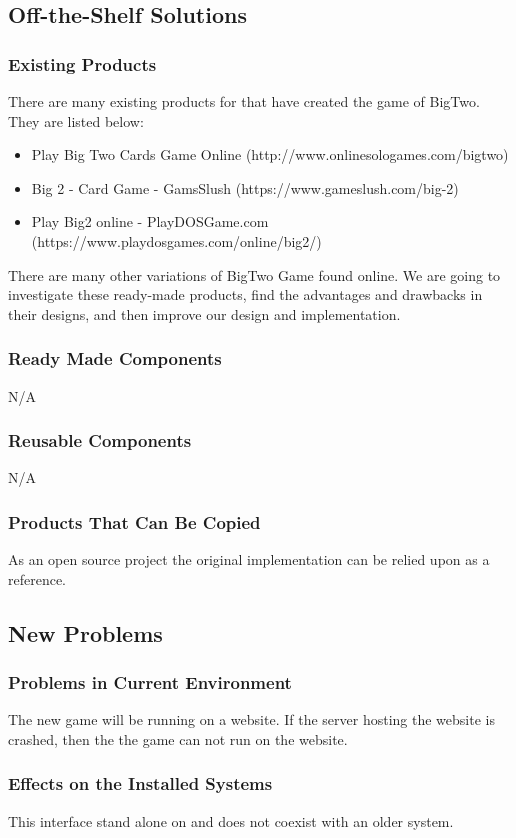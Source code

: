 \documentclass[12pt, titlepage]{article}
\begin{document}
\subsection{Off-the-Shelf Solutions}
\subsubsection{Existing Products}
There are many existing products for that have created the game of BigTwo. They are listed below:
\begin{itemize}
    \item Play Big Two Cards Game Online (http://www.onlinesologames.com/bigtwo)
    \item Big 2 - Card Game - GamsSlush (https://www.gameslush.com/big-2)
    \item Play Big2 online - PlayDOSGame.com (https://www.playdosgames.com/online/big2/)
\end{itemize}
There are many other variations of BigTwo Game found online. We are going to investigate these ready-made products, find the advantages and drawbacks in their designs, and then improve our design and implementation.
\subsubsection{Ready Made Components}
N/A
\subsubsection{Reusable Components}
N/A
\subsubsection{Products That Can Be Copied}
As an open source project the original implementation can be relied upon as a reference.
\subsection{New Problems}
\subsubsection{Problems in Current Environment}
The new game will be running on a website. If the server hosting the website is crashed, then the the game can not run on the website.
\subsubsection{Effects on the Installed Systems}
This interface stand alone on and does not coexist with an older system.
\end{document}

